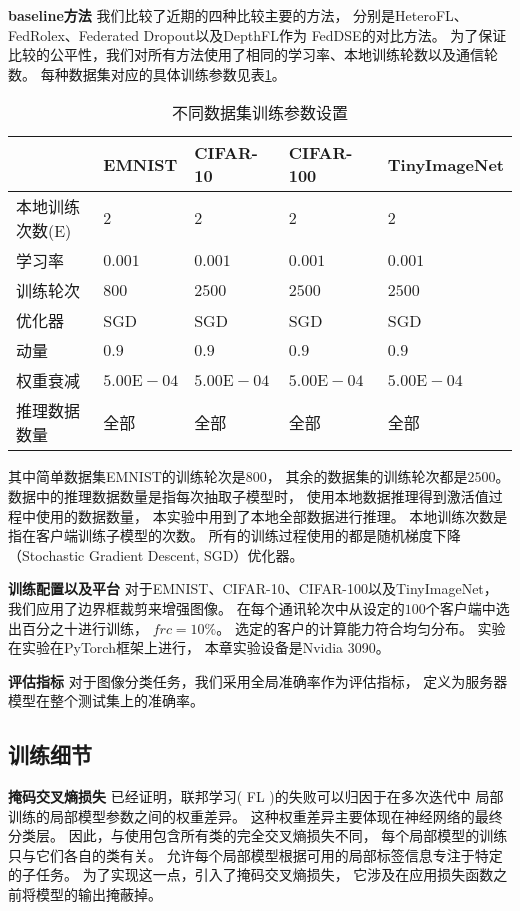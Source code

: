 \textbf{baseline方法 }
我们比较了近期的四种比较主要的方法，
分别是HeteroFL、FedRolex、Federated Dropout以及DepthFL作为
FedDSE的对比方法。
为了保证比较的公平性，我们对所有方法使用了相同的学习率、本地训练轮数以及通信轮数。
每种数据集对应的具体训练参数见表\ref{tab:train_info}。
\begin{table}[thbp]
    \caption{\label{tab:train_info}不同数据集训练参数设置}
    \begin{tabularx}{\linewidth}{l X<{\centering} X<{\centering} X<{\centering} X<{\centering}}
        \toprule
        & EMNIST & CIFAR-10 & CIFAR-100 & TinyImageNet \\ \hline
        本地训练次数(E) & $2$ & $2$ & $2$ & $2$ \\ 
        学习率 & $0.001$ & $0.001$ & $0.001$ & $0.001$ \\ 
        训练轮次 & $800$ & $2500$ & $2500$ & $2500$ \\ 
        优化器 & SGD & SGD & SGD & SGD \\ 
        动量 & $0.9$ & $0.9$ & $0.9$ & $0.9$ \\ 
        权重衰减 & $5.00\text{E}-04$ & $5.00\text{E}-04$ & $5.00\text{E}-04$ & $5.00\text{E}-04$ \\ 
        推理数据数量 & 全部 & 全部 & 全部 & 全部 \\ 
        \bottomrule
    \end{tabularx}
\end{table}
其中简单数据集EMNIST的训练轮次是$800$，
其余的数据集的训练轮次都是$2500$。
数据中的推理数据数量是指每次抽取子模型时，
使用本地数据推理得到激活值过程中使用的数据数量，
本实验中用到了本地全部数据进行推理。
本地训练次数是指在客户端训练子模型的次数。
所有的训练过程使用的都是随机梯度下降（Stochastic Gradient Descent, SGD）优化器。

\textbf{训练配置以及平台 }
对于EMNIST、CIFAR-10、CIFAR-100以及TinyImageNet，
我们应用了边界框裁剪来增强图像\cite{zoph2020learning}。
在每个通讯轮次中从设定的$100$个客户端中选出百分之十进行训练，
$frc = 10\%$。
选定的客户的计算能力符合均匀分布。
实验在实验在PyTorch框架\cite{paszke2019pytorch}上进行，
本章实验设备是Nvidia 3090。

\textbf{评估指标 }
对于图像分类任务，我们采用全局准确率作为评估指标，
定义为服务器模型在整个测试集上的准确率。

\subsection{训练细节}
\label{sec:feddse_tricks}
\textbf{掩码交叉熵损失 }
已经证明，联邦学习( FL )的失败可以归因于在多次迭代中
局部训练的局部模型参数之间的权重差异。
这种权重差异主要体现在神经网络的最终分类层。
因此，与使用包含所有类的完全交叉熵损失不同，
每个局部模型的训练只与它们各自的类有关。
允许每个局部模型根据可用的局部标签信息专注于特定的子任务。
为了实现这一点，引入了掩码交叉熵损失，
它涉及在应用损失函数之前将模型的输出掩蔽掉。

